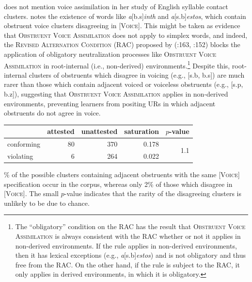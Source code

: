 \citet{Pierrehumbert1994} does not mention voice assimilation in her study of English syllable contact clusters. \citet[][74f.]{Hammond1999a} notes the existence of words like \emph{a}[b.s]\emph{inth} and \emph{a}[s.b]\emph{estos}, which contain obstruent voice clusters disagreeing in [\textsc{Voice}]. This might be taken as evidence that \textsc{Obstruent Voice Assimilation} does not apply to simplex words, and indeed, the \textsc{Revised Alternation Condition} (RAC) proposed by \citeauthor{Kiparsky1973a} (\citeyear{Kiparsky1973a}:163, \citeyear{Kiparsky1982a}:152) blocks the application of obligatory neutralization processes like \textsc{Obstruent Voice Assimilation} in root-internal (i.e., non-derived) environments.\footnote{The ``obligatory'' condition on the RAC has the result that \textsc{Obstruent Voice Assimilation} is always consistent with the RAC whether or not it applies in non-derived environments. If the rule applies in non-derived environments, then it has lexical exceptions (e.g., \emph{a}[s.b]\emph{estos}) and is not obligatory and thus free from the RAC. On the other hand, if the rule is subject to the RAC, it only applies in derived environments, in which it is obligatory.} Despite this, root-internal clusters of obstruents which disagree in voicing (e.g., [s.b, b.s]) are much rarer than those which contain adjacent voiced or voiceless obstruents (e.g., [s.p, b.z]), suggesting that \textsc{Obstruent Voice Assimilation} applies in non-derived environments, preventing learners from positing URs in which adjacent obstruents do not agree in voice.

\begin{example}
\begin{tabular}{l r r r r}
\toprule
           & attested & unattested & saturation & $p$-value                   \\
\midrule
conforming & 80       & 370        & 0.178      & \multirow{2}{*}{1.1\e{-11}} \\
violating  &  6       & 264        & 0.022                                    \\
\bottomrule
\end{tabular}
\end{example}

\% of the possible clusters containing adjacent obstruents with the same [\textsc{Voice}] specification occur in the corpus, whereas only 2\%  of those which disagree in [\textsc{Voice}]. The small $p$-value indicates that the rarity of the disagreeing clusters is unlikely to be due to chance.

